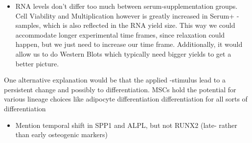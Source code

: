 \begin{itemize}
\item RNA levels don't differ too much between serum-supplementation groups. Cell Viability and Multiplication however is greatly increased in Serum+ - samples, which is also reflected in the RNA yield size. This way we could accommodate longer experimental time frames, since relaxation could happen, but we just need to increase our time frame. Additionally, it would allow us to do Western Blots which typically need bigger yields to get a better picture. 
\end{itemize}

One alternative explanation would be that the applied \Yoda{}-stimulus lead to a persistent change and possibly to differentiation. MSCs hold the potential for various lineage choices like adipocyte differentiation differentiation for all sorts of differentiation

\begin{itemize}
	\item Mention temporal shift in SPP1 and ALPL, but not RUNX2 (late- rather than early osteogenic markers)
\end{itemize}

